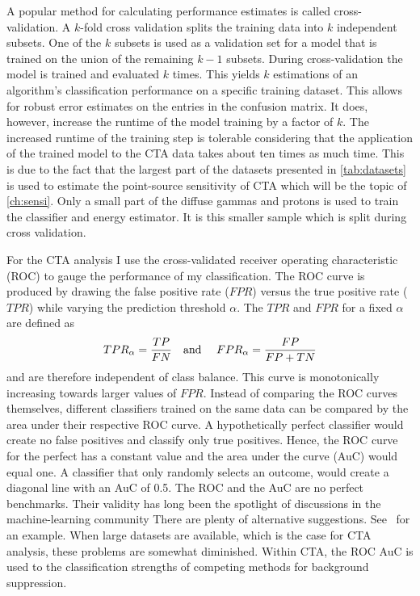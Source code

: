 A popular method for calculating performance estimates is called cross-validation. 
A $k$-fold cross validation splits the training data into $k$ independent subsets.
One of the $k$ subsets is used as a validation set for a model that is trained on the union of the remaining $k{}-{}1$ subsets.
During cross-validation the model is trained and evaluated $k$ times. 
This yields $k$  estimations of an algorithm's classification performance on a specific training dataset. 
This allows for robust error estimates on the entries in the confusion matrix. 
It does, however, increase the runtime of the model training by a factor of $k$.
The increased runtime of the training step is tolerable considering that the application of the trained model to the CTA data takes about ten times as much time.
This is due to the fact that the largest part of the datasets presented in \cref{tab:datasets} is used to estimate the point-source sensitivity of CTA which will be the topic 
of \cref{ch:sensi}. 
Only a small part of the diffuse gammas and protons is used to train the classifier and energy estimator. It is this smaller sample which is split during cross validation. 

 
For the CTA analysis I use the cross-validated receiver operating characteristic (ROC) to gauge the performance of my classification.
The ROC curve is produced by drawing the false positive rate ($FPR$) versus the true positive rate ($TPR$) 
while varying the prediction threshold $\alpha$. The $TPR$ and $FPR$ for a fixed $\alpha$ are defined as 
\begin{equation*}
        TPR_{\alpha} =  \frac{TP}{FN} \text{\quad and \quad} FPR_{\alpha} = \frac{FP}{FP + TN}
\end{equation*}
and are therefore independent of class balance. This curve is monotonically increasing towards larger values of $FPR$. 
Instead of comparing the ROC curves themselves, different classifiers trained on the same data can be compared by the area under their respective ROC curve. 
A hypothetically perfect classifier would create no false positives and classify only true positives. Hence, the ROC curve for the perfect 
has a constant value and the area under the curve (AuC) would equal one.
A classifier that only randomly selects an outcome, would create a diagonal line with an AuC of 0.5.
The ROC and the AuC are no perfect benchmarks. Their validity has long been the spotlight of discussions in the machine-learning community
There are plenty of alternative suggestions. See~\cite{roc_auc_bad} for an example.
When large datasets are available, which is the case for CTA analysis, these problems are somewhat diminished.
Within CTA, the ROC AuC is used to the classification strengths of competing methods for background suppression. 

